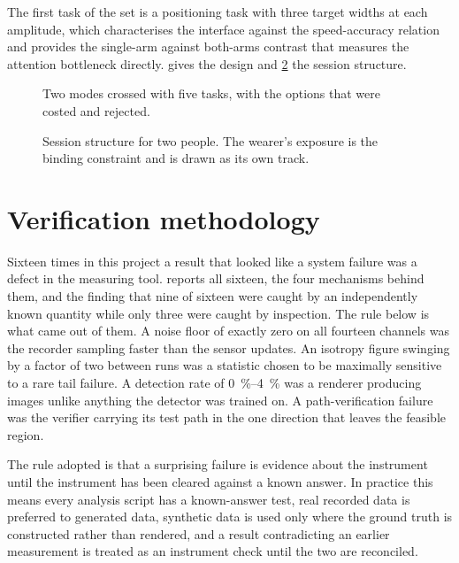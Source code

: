 The first task of the set is a positioning task with three target widths at
each amplitude, which characterises the interface against the
speed-accuracy relation~\cite{fitts1954information} and provides the
single-arm against both-arms contrast that measures the attention bottleneck
directly.  gives the design and \cref{fig:timeline} the
session structure.

\begin{figure}
  \centering
  \resizebox{\textheight}{!}{}
  \caption[Experimental design]{Two modes crossed with five tasks, with the
  options that were costed and rejected.}
  \label{fig:expdesign}
\end{figure}

\begin{figure}
  \centering
  \resizebox{\textheight}{!}{}
  \caption[Session timeline]{Session structure for two people. The wearer's
  exposure is the binding constraint and is drawn as its own track.}
  \label{fig:timeline}
\end{figure}

\section{Verification methodology}

Sixteen times in this project a result that looked like a system failure was
a defect in the measuring tool.  reports all sixteen, the
four mechanisms behind them, and the finding that nine of sixteen were caught
by an independently known quantity while only three were caught by inspection.
The rule below is what came out of them. A noise floor of exactly zero on all fourteen
channels was the recorder sampling faster than the sensor updates. An
isotropy figure swinging by a factor of two between runs was a statistic
chosen to be maximally sensitive to a rare tail failure. A detection rate of
\SIrange{0}{4}{\percent} was a renderer producing images unlike anything the
detector was trained on. A path-verification failure was the verifier carrying
its test path in the one direction that leaves the feasible region.

The rule adopted is that a surprising failure is evidence about the instrument
until the instrument has been cleared against a known answer. In practice this
means every analysis script has a known-answer test, real recorded data is
preferred to generated data, synthetic data is used only where the ground
truth is constructed rather than rendered, and a result contradicting an
earlier measurement is treated as an instrument check until the two are
reconciled.

